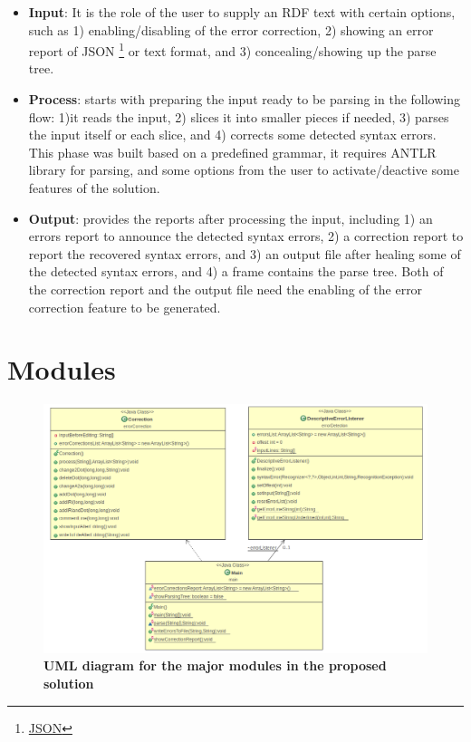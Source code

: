  \begin{itemize}
 \item \textbf {Input}: It is the role of the user to supply an RDF text with certain options, such as 1) enabling/disabling of the error correction, 2) showing an error report of JSON \footnote{\href{https://www.json.org/}{JSON}} or text format, and 3) concealing/showing up the parse tree.
\item \textbf{Process}: starts with preparing the input ready to be parsing in the following flow: 1)it reads the input, 2) slices it into smaller pieces if needed, 3) parses the input itself or each slice, and 4) corrects some detected syntax errors. This phase was built based on a predefined grammar, it requires ANTLR library for parsing, and some options from the user to activate/deactive some features of the solution.   
\item \textbf{Output}: provides the reports after processing the input, including 1) an errors report to announce the detected syntax errors, 2) a correction report to report the recovered syntax errors, and 3) an output file after healing some of the detected syntax errors, and 4) a frame contains the parse tree. Both of the correction report and the output file need the enabling of the error correction feature to be generated. 
\end{itemize}



\section {Modules} 

	\begin{figure}[ht]
	\begin{center}
		\includegraphics[scale=0.39,angle=0]{images/modules.png}
				\setlength\belowcaptionskip{-7mm}
		\caption{\textbf{UML diagram for the major modules in the proposed solution}}
		\label{Fig:UML}
	\end{center}
\end{figure}

